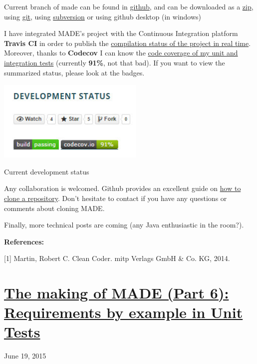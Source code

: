 \documentclass[a4paper]{article}
\begin{document}
Current branch of made can be found in
\href{https://github.com/raiben/made}{github}, and can be downloaded as
a \href{https://github.com/raiben/made/archive/master.zip}{zip}, using
\href{https://github.com/raiben/made.git}{git}, using
\href{https://github.com/raiben/made}{subversion} or using github
desktop (in windows)

I have integrated MADE{\textquoteright}s project with the Continuous
Integration platform \textbf{Travis CI} in order to publish the
\href{https://travis-ci.org/raiben/made}{compilation status of the
project in real time}. Moreover, thanks to \textbf{Codecov} I can know
the \href{https://codecov.io/github/raiben/made?branch=master}{code
coverage of my unit and integration tests} (currently \textbf{91\%},
not that bad). If you want to view the summarized status, please look
at the badges.

\href{http://www.velonuboso.com/made/blog/wp-content/uploads/2015/06/Chrome-Legacy-Window-16062015-190918.jpg}{
\includegraphics[width=7.011cm,height=3.863cm]{makingofmade113-img5.jpg}
}

Current development status
~

Any collaboration is welcomed. Github provides an excellent guide on
\href{https://help.github.com/articles/cloning-a-repository/}{how to
clone a repository}. Don{\textquoteright}t hesitate to contact if you
have any questions or comments about cloning MADE.

Finally, more technical posts are coming (any Java enthusiastic in the
room?).

{\bfseries
References:}

[1] Martin, Robert C. Clean Coder. mitp Verlags GmbH \& Co. KG, 2014.


\bigskip

\clearpage\section[The making of MADE (Part 6): Requirements by example
in Unit
Tests]{\href{http://www.velonuboso.com/made/2015/06/19/making-part-6-requirements-expressed-junit-tests/}{The
making of MADE (Part 6): Requirements by example in Unit Tests}}
June 19, 2015
\end{document}
